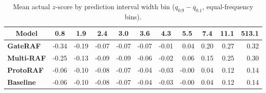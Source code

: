 \begin{table}[t]
    \caption{Mean actual $z$-score by prediction interval width bin ($q_{0.9}-q_{0.1}$, equal-frequency bins).}
    \label{tab:interval_calibration}
    \centering
    \begin{tabular}{lrrrrrrrrrr}
    \hline
    \multicolumn{1}{c}{Model} & \multicolumn{1}{c}{0.8} & \multicolumn{1}{c}{1.9} & \multicolumn{1}{c}{2.4} & \multicolumn{1}{c}{3.0} & \multicolumn{1}{c}{3.6} & \multicolumn{1}{c}{4.3} & \multicolumn{1}{c}{5.5} & \multicolumn{1}{c}{7.4} & \multicolumn{1}{c}{11.1} & \multicolumn{1}{c}{513.1} \\
    \hline\hline
    \quad \textbf{GateRAF} & -0.34 & -0.19 & -0.07 & -0.07 & -0.07 & -0.01 & 0.04 & 0.20 & 0.27 & 0.32 \\
    \quad \textbf{Multi-RAF} & -0.25 & -0.13 & -0.09 & -0.09 & -0.06 & -0.02 & 0.06 & 0.15 & 0.25 & 0.30 \\
    \quad \textbf{ProtoRAF} & -0.06 & -0.10 & -0.08 & -0.07 & -0.04 & -0.03 & -0.00 & 0.04 & 0.12 & 0.14 \\
    \quad \textbf{Baseline} & -0.06 & -0.10 & -0.08 & -0.07 & -0.04 & -0.03 & -0.00 & 0.04 & 0.12 & 0.14 \\
    \hline
    \end{tabular}
\end{table}
